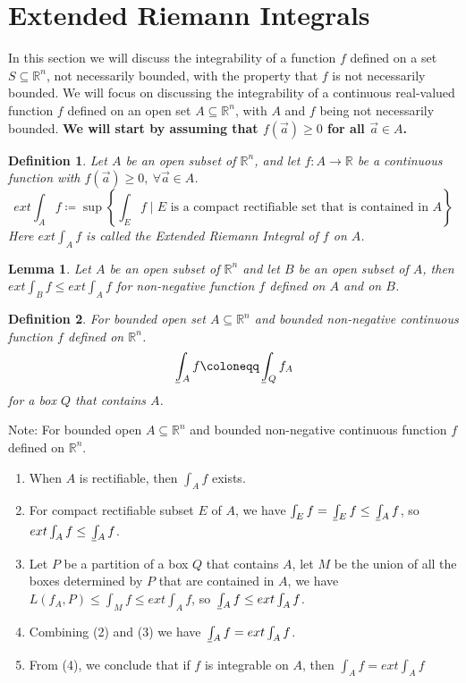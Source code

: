 \documentclass[11pt,oneside]{book}
\theoremstyle{break}
\theoremstyle{break}
\newtheorem{lem}{Lemma}[thm]
\newtheorem{defn}{Definition}[corL]
\def\lowint{\mkern3mu\underline{\vphantom{\intop}\mkern7mu}\mkern-10mu\int}
\newcommand{\R}{\mathbb{R}}
\newcommand{\note}{\color{red}Note: \color{black}}
\begin{document}
\newpage
\section[Extended Riemann Integral]{\color{red}Extended Riemann Integrals \color{black}}

In this section we will discuss the integrability of a function $f$ defined on a set $S\subseteq \R^n$, not necessarily bounded, with the property that $f$ is not necessarily bounded. We will focus on discussing the integrability of a continuous real-valued function $f$ defined on an open set $A\subseteq \R^n$, with $A$ and $f$ being not necessarily bounded. \textbf{We will start by assuming that $f(\vec{a}) \geq 0$ for all $\vec{a}\in A$.}

\begin{defn}
Let $A$ be an open subset of $\R^n$, and let $f:A \to \R$ be a continuous function with $f(\vec{a}) \geq 0,\ \forall\vec{a}\in A$. 
$$ext \int_A f \coloneqq \sup\left\{ \int_E f  \mid E \text{ is a compact rectifiable set that is contained in } A\right\}$$
Here $ext \int_A f$ is called the Extended Riemann Integral of $f$ on $A$.
\end{defn}

\begin{lem}
Let $A$ be an open subset of $\R^n$ and let $B$ be an open subset of $A$, then $ext \int_B f  \leq ext \int_A f$ for non-negative function $f$ defined on $A$ and on $B$. 
\end{lem}

\begin{defn}
For bounded open set $A\subseteq \R^n$ and bounded non-negative continuous function $f$ defined on $\R^n$. $$\lowint_A f \coloneqq \lowint_Q f_A$$ for a box $Q$ that contains $A$.
\end{defn}

\note For bounded open $A\subseteq \R^n$ and bounded non-negative continuous function $f$ defined on $\R^n$.
\begin{enumerate}[topsep=3pt,itemsep=-1ex,partopsep=1ex,parsep=1ex]
\item When $A$ is rectifiable, then $\int_A f$ exists.
\item For compact rectifiable subset $E$ of $A$, we have $\int_E f = \lowint_E f \leq \lowint_A f$, so $ext \int_A f \leq \lowint_A f$.
\item Let $P$ be a partition of a box $Q$ that contains $A$, let $M$ be the union of all the boxes determined by $P$ that are contained in $A$, we have $L(f_A, P ) \leq \int_{M} f \leq ext \int_A f$, so $\lowint_A f \leq ext \int_A f$.
\item Combining (2) and (3) we have $\lowint_A f = ext \int_A f$.
\item From (4), we conclude that if $f$ is integrable on $A$, then $\int_A f = ext\int_A f$
\end{enumerate}
\end{document}
